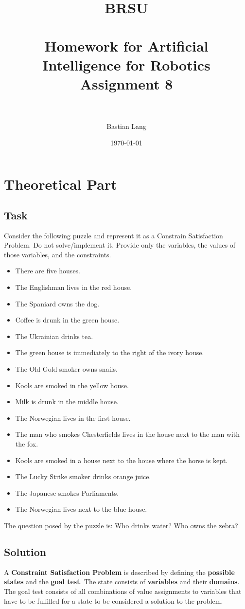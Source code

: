 \documentclass[paper=a4, fontsize=11pt]{scrartcl} %
\title{	
\normalfont \normalsize 
\textsc{BRSU} \\ [25pt] %
\horrule{0.5pt} \\[0.4cm] %
\huge Homework for Artificial Intelligence for Robotics\\Assignment 8 \\ %
\horrule{2pt} \\[0.5cm] %
}
\author{Bastian Lang} %
\date{\normalsize\today} %
\numberwithin{equation}{section} %
\numberwithin{figure}{section} %
\numberwithin{table}{section} %
\begin{document}
\maketitle %

\section{Theoretical Part}
\subsection{Task}
Consider the following puzzle and represent it as a Constrain Satisfaction Problem. Do
not solve/implement it. Provide only the variables, the values of those variables, and the
constraints.
\begin{itemize}
\item There are five houses.
\item The Englishman lives in the red house.
\item The Spaniard owns the dog.
\item Coffee is drunk in the green house.
\item The Ukrainian drinks tea.
\item The green house is immediately to the right of the ivory house.
\item The Old Gold smoker owns snails.
\item Kools are smoked in the yellow house.
\item Milk is drunk in the middle house.
\item The Norwegian lives in the first house.
\item The man who smokes Chesterfields lives in the house next to the man with the fox.
\item Kools are smoked in a house next to the house where the horse is kept.
\item The Lucky Strike smoker drinks orange juice.
\item The Japanese smokes Parliaments.
\item The Norwegian lives next to the blue house.
\end{itemize}
The question posed by the puzzle is: Who drinks water? Who owns the zebra?

\subsection{Solution}
A \textbf{Constraint Satisfaction Problem} is described by defining the \textbf{possible states} and the \textbf{goal test}. The state consists of \textbf{variables} and their \textbf{domains}. The goal test consists of all combinations of value assignments to variables that have to be fulfilled for a state to be considered a solution to the problem.
\end{document}

